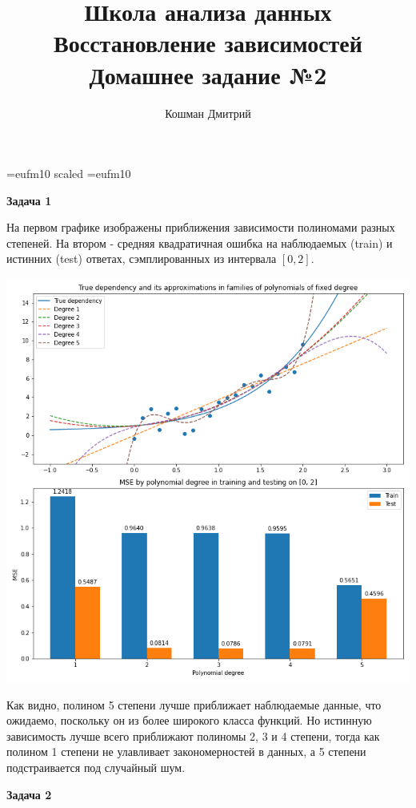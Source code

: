 \documentclass[10pt]{article}
\title{Школа анализа данных\\ Восстановление зависимостей \\Домашнее задание №2}
\author{Кошман Дмитрий}
\date{}
\begin{document}
	
	
	\voffset=-20mm
	\hoffset=-17mm
	\font\Got=eufm10 scaled \font\Got=eufm10
	
	
	\maketitle
	
	\bigskip
	
	\textbf{Задача 1}
	
	\medskip
	
	На первом графике изображены приближения зависимости полиномами разных степеней. На втором - средняя квадратичная ошибка на наблюдаемых (train) и истинних (test) ответах, сэмплированных из интервала $[0, 2]$.
	
	\includegraphics[width=.8\textwidth]{dependency hw2 task1.png}
	
	Как видно, полином 5 степени лучше приближает наблюдаемые данные, что ожидаемо, поскольку он из более широкого класса функций. Но истинную зависимость лучше всего приближают полиномы 2, 3 и 4 степени, тогда как полином 1 степени не улавливает закономерностей в данных, а 5 степени подстраивается под случайный шум.
		
	\bigskip
	
	\textbf{Задача 2}
	
	\medskip
	
\end{document}
